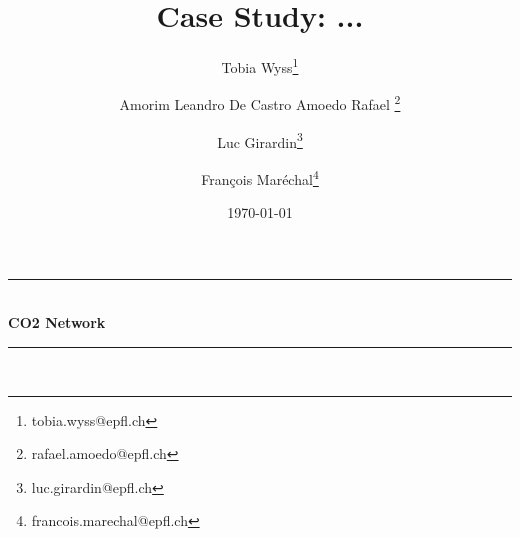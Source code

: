 
\begin{titlepage}

\newcommand{\HRule}{\rule{\linewidth}{0.5mm}} %
\begin{center}{
\HRule \\[0.4cm] 
\huge \bfseries{CO2 Network}
\HRule \\[0.5cm]}
\end{center}

\title{Case Study: ...}

\author[2]{Tobia Wyss\thanks{tobia.wyss@epfl.ch}}

\author[1]{Amorim Leandro De Castro Amoedo Rafael \thanks{rafael.amoedo@epfl.ch}}
\author[1]{Luc Girardin\thanks{luc.girardin@epfl.ch}}
\author[1]{Fran\c{c}ois Mar\'echal\thanks{francois.marechal@epfl.ch}}




 

\date{\today} %
{\let\newpage\relax\maketitle}
\vspace*{\fill}

\begin{figure*}[!htb]
\centering
{}\hfill
\quad
{}
\end{figure*}

\thispagestyle{postprintnote}

\end{titlepage}





